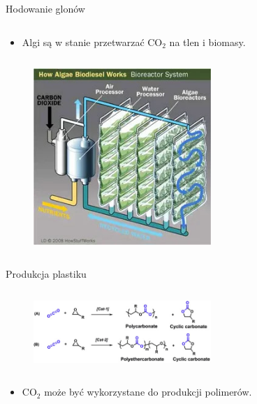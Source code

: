 \begin{columnframe}{Hodowanie glonów}
    \begin{column}{0.5\textwidth}
        \begin{itemize}
            \item Algi są w stanie przetwarzać CO$_2$ na tlen i biomasy.
        \end{itemize}
    \end{column}
    \begin{column}{0.5\textwidth}
        \begin{figure}
            \centering
            \includegraphics[width=0.6\textwidth, frame]{images/algae_biodiesel.jpg}
        \end{figure}
    \end{column}
\end{columnframe}

\begin{columnframe}{Produkcja plastiku}
    \begin{column}{0.5\textwidth}
        \begin{figure}
            \centering
            \includegraphics[width=0.6\textwidth, frame]{images/plastic_from_co2.jpg}
        \end{figure}
    \end{column}
    \begin{column}{0.5\textwidth}
        \begin{itemize}
            \item CO$_2$ może być wykorzystane do produkcji polimerów.
        \end{itemize}
    \end{column}
\end{columnframe}


